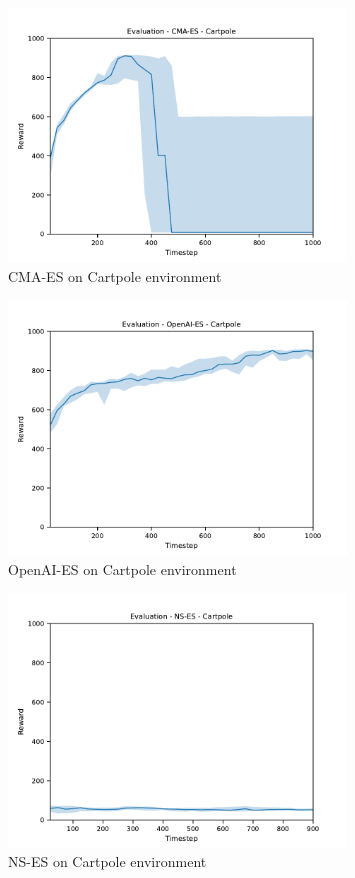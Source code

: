\begin{figure}[H]
    \includegraphics[width=0.8\textwidth]{img/eval-cart-cmaes.pdf}
    \caption{CMA-ES on Cartpole environment}
    \label{fig:cart-cma}
\end{figure}
\begin{figure}[H]
    \includegraphics[width=0.8\textwidth]{img/eval-cart-open.pdf}
    \caption{OpenAI-ES on Cartpole environment}
    \label{fig:cart-open}

\end{figure}
\begin{figure}[H]
    \includegraphics[width=0.8\textwidth]{img/eval-cart-nses.pdf}
    \caption{NS-ES on Cartpole environment}
    \label{fig:cart-ns}

\end{figure}
